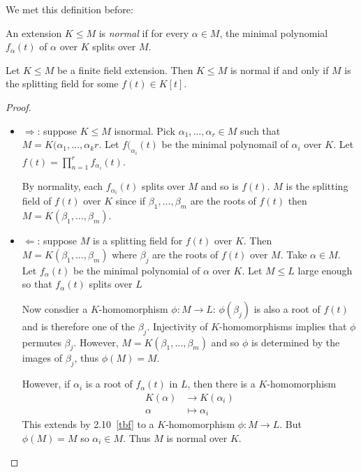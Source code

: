 \documentclass[a4paper]{article}
\begin{document}
We met this definition before:

\begin{definition}
  An extension \(K \leq M\) is \emph{normal} if for every \(\alpha \in M\), the minimal polynomial \(f_\alpha(t)\) of \(\alpha\) over \(K\) splits over \(M\).
\end{definition}

\begin{theorem}
  Let \(K \leq M\) be a finite field extension. Then \(K \leq M\) is normal if and only if \(M\) is the splitting field for some \(f(t) \in K[t]\).
\end{theorem}

\begin{proof}\leavevmode
  \begin{itemize}
  \item \(\Rightarrow\): suppose \(K \leq M\) isnormal. Pick \(\alpha_1, \dots, \alpha_r \in M\) such that \(M = K(\alpha_1, \dots, \alpha_kr\). Let \(f(_{\alpha_i}(t)\) be the minimal polynomail of \(\alpha_i\) over \(K\). Let \(f(t) = \prod_{n = 1}^{r} f_{\alpha_i}(t)\).

    By normality, each \(f_{\alpha_i}(t)\) splits over \(M\) and so is \(f(t)\). \(M\) is the splitting field of \(f(t)\) over \(K\) since if \(\beta_1, \dots, \beta_m\) are the roots of \(f(t)\) then \(M = K(\beta_1, \dots, \beta_m)\).
  \item \(\Leftarrow\): suppose \(M\) is a splitting field for \(f(t)\) over \(K\). Then \(M = K(\beta_1, \dots, \beta_m)\) where \(\beta_j\) are the roots of \(f(t)\) over \(M\). Take \(\alpha \in M\). Let \(f_\alpha(t)\) be the minimal polynomial of \(\alpha\) over \(K\). Let \(M \leq L\) large enough so that \(f_\alpha(t)\) splits over \(L\)

    Now consdier a \(K\)-homomorphism \(\phi: M \to L\): \(\phi(\beta_j)\) is also a root of \(f(t)\) and is therefore one of the \(\beta_j\). Injectivity of \(K\)-homomorphisms implies that \(\phi\) permutes \(\beta_j\). However, \(M = K(\beta_1, \dots, \beta_m)\) and so \(\phi\) is determined by the images of \(\beta_j\), thus \(\phi(M) = M\).

    However, if \(\alpha_i\) is a root of \(f_\alpha(t)\) in \(L\), then there is a \(K\)-homomorphism
    \begin{align*}
      K(\alpha) &\to K(\alpha_i) \\
      \alpha &\mapsto \alpha_i
    \end{align*}
    This extends by 2.10~\ref{tbf} to a \(K\)-homomorphism \(\phi: M \to L\). But \(\phi(M) = M\) so \(\alpha_i \in M\). Thus \(M\) is normal over \(K\).
  \end{itemize}
\end{proof}
\end{document}

